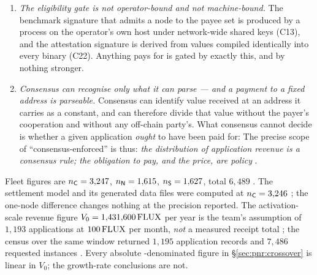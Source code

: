\begin{assumption}
\begin{enumerate}
    leave it undescribed: 
    relative to the design work S1 below has to do to contain it.
  \item[\textbf{A4}] \emph{The eligibility gate is not operator-bound and not machine-bound.} The
    benchmark signature that admits a node to the payee set is produced by a process on the
    operator's own host under network-wide shared keys (C13), and the \ArcaneOS attestation
    signature is derived from values compiled identically into every binary (C22). Anything \PNR
    pays for is gated by exactly this, and by nothing stronger.
  \item[\textbf{A5}] \emph{Consensus can recognise only what it can parse --- and a payment to a
    fixed address is parseable.} Consensus can identify value received at an address it carries as a
    constant, and can therefore divide that value without the payer's cooperation and without any
    off-chain party's. What consensus cannot decide is whether a given application \emph{ought} to
    have been paid for:  The precise scope
    of ``consensus-enforced'' is thus: \emph{the distribution of application revenue is a consensus
    rule; the obligation to pay, and the price, are policy} .
\end{enumerate}
\end{assumption}

\begin{assumption}
\label{as:pnr:fleet}
Fleet figures are $n_{\mathsf{C}} = 3{,}247$, $n_{\mathsf{N}} = 1{,}615$, $n_{\mathsf{S}} = 1{,}627$,
total $6{,}489$ . The settlement model
and its generated data files were computed at $n_{\mathsf{C}} = 3{,}246$
; the one-node difference changes nothing at
the precision reported. The activation-scale revenue figure $V_0 = 1{,}431{,}600 \,\mathrm{FLUX}$ per year is
the team's assumption of $1{,}193$ applications at $100\,\mathrm{FLUX}$ per month, \emph{not} a measured
receipt total ; the census over the same window returned
$1{,}195$ application records and $7{,}486$ requested instances
. Every absolute
\flux-denominated figure in \S\ref{sec:pnr:crossover} is linear in $V_0$; the growth-rate
conclusions are not.
\end{assumption}

